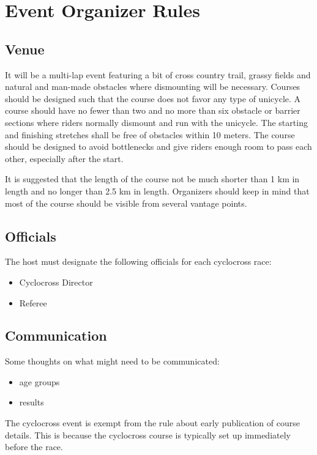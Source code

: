 \chapter{Event Organizer Rules}

\section{Venue}

It will be a multi-lap event featuring a bit of cross country trail, grassy fields and natural and man-made obstacles where dismounting will be necessary.
Courses should be designed such that the course does not favor any type of unicycle.
A course should have no fewer than two and no more than six obstacle or barrier sections where riders normally dismount and run with the unicycle.
The starting and finishing stretches shall be free of obstacles within 10 meters.
The course should be designed to avoid bottlenecks and give riders enough room to pass each other, especially after the start.

It is suggested that the length of the course not be much shorter than 1 km in length and no longer than 2.5 km in length.
Organizers should keep in mind that most of the course should be visible from several vantage points.

\section{Officials}

The host must designate the following officials for each cyclocross race:
\begin{itemize}
\item Cyclocross Director
\item Referee
\end{itemize}

\section{Communication}

\begin{comment2016}
Some thoughts on what might need to be communicated:
\begin{itemize}
\item age groups
\item results
\end{itemize}
\end{comment2016}

The cyclocross event is exempt from the rule about early publication of course details.
This is because the cyclocross course is typically set up immediately before the race.

